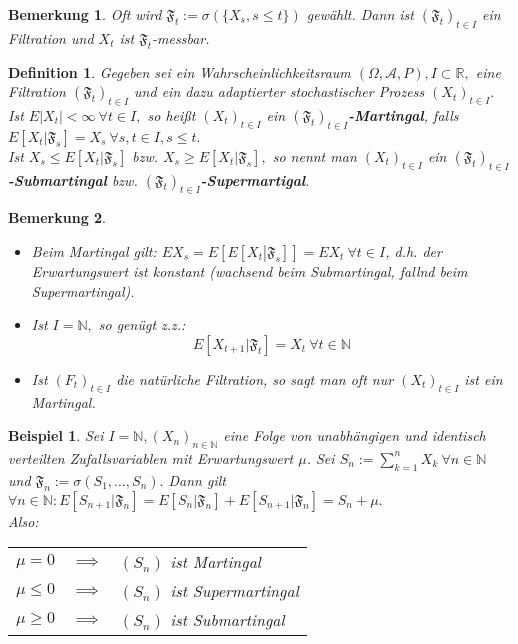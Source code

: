 \documentclass[a4paper,11pt]{book}
\newcommand{\R}{{\mathbb R}}
\newcommand{\N}{{\mathbb N}}
\def\AA{ \mathcal{A} }
\def\FF{ \mathfrak{F} }
\def\folgt{\ensuremath{\implies}}
\newtheorem*{DefON}{Definition}
\newtheorem{Bsp}{Beispiel}[chapter]
\newtheorem*{BemON}{Bemerkung}
\theoremstyle{nonumberplain}
\begin{document}
\begin{BemON} Oft wird $\FF_t := \sigma(\{X_s, s\le t\})$ gewählt. Dann ist $(\FF_t)_{t\in I}$ ein Filtration und $X_t$ ist $\FF_t$-messbar.
\end{BemON}

\begin{DefON}
Gegeben sei ein Wahrscheinlichkeitsraum $(\Omega, \AA, P), I\subset\R,$ eine Filtration $(\FF_t)_{t\in I}$ und ein dazu adaptierter stochastischer Prozess $(X_t)_{t\in I}.$ Ist $E|X_t|<\infty\ \forall t\in I,$ so heißt $(X_t)_{t\in I}$ ein \textbf{$(\FF_t)_{t\in I}$-Martingal}, falls $E[X_t|\FF_s] = X_s\ \forall s, t\in I, s\le t.$\\
Ist $X_s\le E[X_t|\FF_s]$ bzw. $X_s\ge E[X_t|\FF_s],$ so nennt man $(X_t)_{t\in I}$ ein \textbf{$(\FF_t)_{t\in I}$-Submartingal} bzw. \textbf{$(\FF_t)_{t\in I}$-Supermartigal}.
\end{DefON}

\begin{BemON}
\begin{itemize}
\item[a)] Beim Martingal gilt: $EX_s = E\left[E\left[X_t\left|\FF_s\right.\right]\right] = EX_t\ \forall t\in I$, d.h. der Erwartungswert ist konstant (wachsend beim Submartingal, fallnd beim Supermartingal).
\item[b)] Ist $I = \N,$ so genügt z.z.:
$$E[X_{t+1}|\FF_t] = X_t\ \forall t\in\N$$
\item[c)] Ist $(F_t)_{t\in I}$ die natürliche Filtration, so sagt man oft nur $(X_t)_{t\in I}$ ist ein Martingal.
\end{itemize}
\end{BemON}

\begin{Bsp} \label{Bsp8.1}
Sei $I=\N, (X_n)_{n\in\N}$ eine Folge von unabhängigen und identisch verteilten Zufallsvariablen mit Erwartungswert $\mu$. Sei $S_n:=\sum_{k=1}^n X_k\ \forall n\in\N$ und $\FF_n:=\sigma(S_1,\ldots, S_n).$ Dann gilt $\forall n\in\N: E[S_{n+1}|\FF_n] = E[S_n|\FF_n] + E[S_{n+1}|\FF_n] = S_n + \mu.$\\
Also: \begin{tabular}[t]{rcp{}}
$\mu = 0$ & $\folgt$ & $(S_n)$ ist Martingal\\
$\mu \le 0$ & $\folgt$ & $(S_n)$ ist Supermartingal\\
$\mu \ge 0$ & $\folgt$ & $(S_n)$ ist Submartingal\\
\end{tabular}
\end{Bsp}
\end{document}
